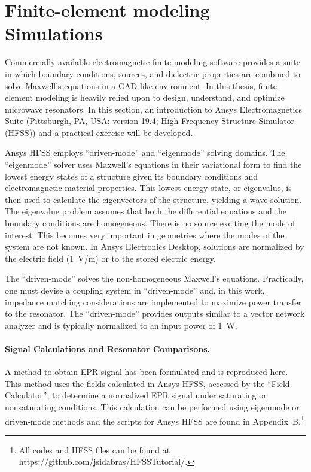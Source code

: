 \section{Finite-element modeling Simulations}
Commercially available electromagnetic finite-modeling software provides a suite in which boundary conditions, sources, and dielectric properties are combined to solve Maxwell's equations in a CAD-like environment. In this thesis, finite-element modeling is heavily relied upon to design, understand, and optimize microwave resonators. In this section, an introduction to Ansys Electromagnetics Suite (Pittsburgh, PA, USA; version 19.4; High Frequency Structure Simulator (HFSS)) and a practical exercise will be developed. 

Ansys HFSS employs ``driven-mode'' and ``eigenmode'' solving domains. The ``eigenmode'' solver uses Maxwell's equations in their variational form to find the lowest energy states of a structure given its boundary conditions and electromagnetic material properties. \cite{sadiku2000numerical,jin2015finite} This lowest energy state, or eigenvalue, is then used to calculate the eigenvectors of the structure, yielding a wave solution. The eigenvalue problem assumes that both the differential equations and the boundary conditions are homogeneous. There is no source exciting the mode of interest. This becomes very important in geometries where the modes of the system are not known. In Ansys Electronics Desktop, solutions are normalized by the electric field (1~V/m) or to the stored electric energy.

The ``driven-mode'' solves the non-homogeneous Maxwell's equations. Practically, one must devise a coupling system in ``driven-mode'' and, in this work, impedance matching considerations are implemented to maximize power transfer to the resonator. The ``driven-mode'' provides outputs similar to a vector network analyzer and is typically normalized to an input power of 1~W. 

\paragraph*{Signal Calculations and Resonator Comparisons.}
A method to obtain EPR signal has been formulated and is reproduced here. \cite{misrabook} This method uses the fields calculated in Ansys HFSS, accessed by the ``Field Calculator'', to determine a normalized EPR signal under saturating or nonsaturating conditions. This calculation can be performed using eigenmode or driven-mode methods and the scripts for Ansys HFSS are found in Appendix~B.\footnote{All codes and HFSS files can be found at https://github.com/jsidabras/HFSSTutorial/.} 


